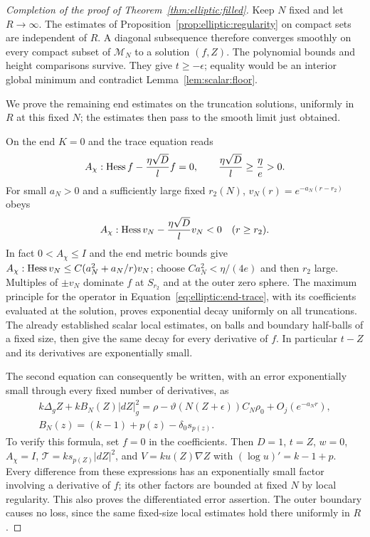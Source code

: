 \begin{proof}[Completion of the proof of Theorem~\ref{thm:elliptic:filled}]
Keep $N$ fixed and let $R\to\infty$.  The estimates of
Proposition~\ref{prop:elliptic:regularity} on compact sets are
independent of $R$.  A diagonal subsequence therefore converges
smoothly on every compact subset of $\mathcal M_N$ to a solution
$(f,Z)$.  The polynomial bounds and height comparisons survive.
They give $t\ge-\epsilon$; equality would be an interior global
minimum and contradict Lemma~\ref{lem:scalar:floor}.

We prove the remaining end estimates on the truncation solutions,
uniformly in $R$ at this fixed $N$; the estimates then pass to the
smooth limit just obtained.

On the end $K=0$ and the trace equation reads
\begin{equation}\label{eq:elliptic:end-trace}
 A_\chi:\operatorname{Hess} f-\frac{\eta\sqrt D}{l}f=0,
 \qquad \frac{\eta\sqrt D}{l}\ge\frac\eta e>0.
\end{equation}
For small $a_N>0$ and a sufficiently large fixed $r_2(N)$,
$v_N(r)=e^{-a_N(r-r_2)}$ obeys
\[
 A_\chi:\operatorname{Hess} v_N-\frac{\eta\sqrt D}{l}v_N<0
 \quad(r\ge r_2).
\]
In fact $0<A_\chi\le I$ and the end metric bounds give
$A_\chi:\operatorname{Hess} v_N\le C(a_N^2+a_N/r)v_N$; choose
$Ca_N^2<\eta/(4e)$ and then $r_2$ large.  Multiples of $\pm v_N$
dominate $f$ at $S_{r_2}$ and at the outer zero sphere.  The maximum
principle for the operator in Equation~\eqref{eq:elliptic:end-trace},
with its coefficients evaluated at the solution, proves exponential
decay uniformly on all truncations.  The already established scalar
local estimates, on balls and boundary half-balls of a fixed size,
then give the same decay for every derivative of $f$.
In particular $t-Z$ and its derivatives are exponentially small.

The second equation can consequently be written, with an error
exponentially small through every fixed number of derivatives, as
\begin{equation}\label{eq:elliptic:end-equation}
\begin{gathered}
 k\Delta_g Z+k B_N(Z)|dZ|_g^2
 =\rho-\vartheta(N(Z+\epsilon))C_N\rho_0+O_j(e^{-a_Nr}),\\
 B_N(z)=(k-1)+p(z)-\delta_0s_{p(z)}.
\end{gathered}
\end{equation}
To verify this formula, set $f=0$ in the coefficients.  Then
$D=1$, $t=Z$, $w=0$, $A_\chi=I$,
$\mathcal T=ks_{p(Z)}|dZ|^2$, and
$V=ku(Z)\nabla Z$ with $(\log u)'=k-1+p$.
Every difference from these expressions has an exponentially small
factor involving a derivative of $f$; its other factors are bounded
at fixed $N$ by local regularity.  This also proves the differentiated
error assertion.  The outer boundary causes no loss, since the same
fixed-size local estimates hold there uniformly in $R$.


\end{proof}
